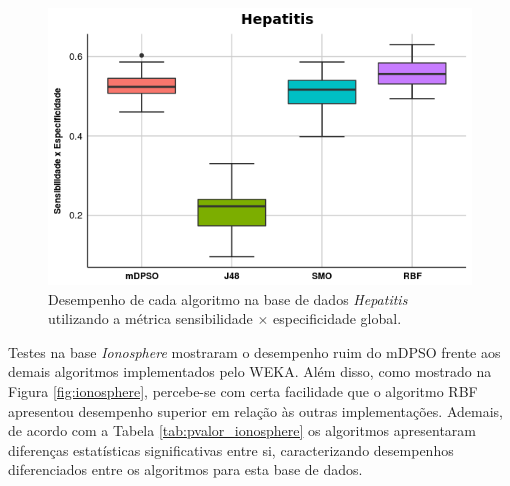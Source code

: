 \documentclass[
	12pt,				%
	openany,			%
	oneside,	
	a4paper,			%
	brazil,				%
	]{unimontes-ppgmsc-abntex2}
\begin{document}
\begin{figure}[!ht]
\centering
\includegraphics[scale=.7]{graficos/hepatitis}
\caption{Desempenho de cada algoritmo na base de dados {\em Hepatitis} utilizando a métrica sensibilidade $\times$ especificidade global.}
\label{fig:hepatitis}
\end{figure}

\begin{table}[!ht]
\setlength{\arrayrulewidth}{.2em}
\vspace{12pt}
\centering{}
\caption{p-valor medido para o produto da sensibilidade pela especificidade global de cada algoritmo na base de dados {\em Hepatitis}.}
\label{tab:pvalor_hepatitis}
\end{table}

Testes na base {\em Ionosphere} mostraram o desempenho ruim do mDPSO frente aos demais algoritmos implementados pelo WEKA. Além disso, como mostrado na Figura \ref{fig:ionosphere}, percebe-se com certa facilidade que o algoritmo RBF apresentou desempenho superior em relação às outras implementações. Ademais, de acordo com a Tabela \ref{tab:pvalor_ionosphere} os algoritmos apresentaram diferenças estatísticas significativas entre si, caracterizando desempenhos diferenciados entre os algoritmos para esta base de dados.
\end{document}
